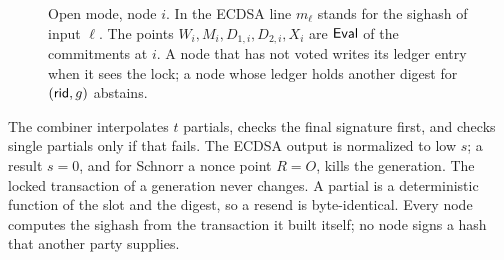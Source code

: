 \begin{figure}[t]
\centering
{}
\caption{Open mode, node $i$. In the ECDSA line $m_\ell$ stands for the sighash of input $\ell$. The points $W_i, M_i, D_{1,i}, D_{2,i}, X_i$ are $\mathsf{Eval}$ of the commitments at $i$. A node that has not voted writes its ledger entry when it sees the lock; a node whose ledger holds another digest for $(\mathsf{rid}, g)$ abstains.}
\label{fig:open}
\end{figure}

The combiner interpolates $t$ partials, checks the final signature first, and checks single partials only if that fails. The ECDSA output is normalized to low $s$; a result $s = 0$, and for Schnorr a nonce point $R = O$, kills the generation. The locked transaction of a generation never changes. A partial is a deterministic function of the slot and the digest, so a resend is byte-identical. Every node computes the sighash from the transaction it built itself; no node signs a hash that another party supplies.

